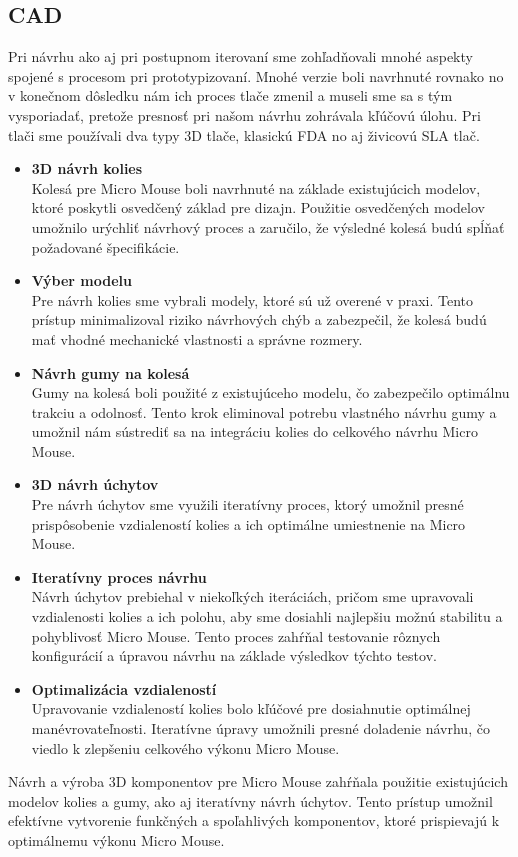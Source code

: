 \clearpage\subsection{CAD}
Pri návrhu ako aj pri postupnom iterovaní sme zohľadňovali mnohé aspekty spojené s procesom pri prototypizovaní. Mnohé verzie boli navrhnuté rovnako no v konečnom dôsledku nám ich proces tlače zmenil a museli sme sa s tým vysporiadať, pretože presnosť pri našom návrhu zohrávala kľúčovú úlohu. Pri tlači sme používali dva typy 3D tlače, klasickú FDA no aj živicovú SLA tlač.
\begin{itemize}
\item \textbf{3D návrh kolies}\\
Kolesá pre Micro Mouse boli navrhnuté na základe existujúcich modelov, ktoré poskytli osvedčený základ pre dizajn. Použitie osvedčených modelov umožnilo urýchliť návrhový proces a zaručilo, že výsledné kolesá budú spĺňať požadované špecifikácie.

\item \textbf{Výber modelu}\\
Pre návrh kolies sme vybrali modely, ktoré sú už overené v praxi. Tento prístup minimalizoval riziko návrhových chýb a zabezpečil, že kolesá budú mať vhodné mechanické vlastnosti a správne rozmery.

\item \textbf{Návrh gumy na kolesá}\\
Gumy na kolesá boli použité z existujúceho modelu, čo zabezpečilo optimálnu trakciu a odolnosť. Tento krok eliminoval potrebu vlastného návrhu gumy a umožnil nám sústrediť sa na integráciu kolies do celkového návrhu Micro Mouse.

\item \textbf{3D návrh úchytov}\\
Pre návrh úchytov sme využili iteratívny proces, ktorý umožnil presné prispôsobenie vzdialeností kolies a ich optimálne umiestnenie na Micro Mouse.

\item \textbf{Iteratívny proces návrhu}\\
Návrh úchytov prebiehal v niekoľkých iteráciách, pričom sme upravovali vzdialenosti kolies a ich polohu, aby sme dosiahli najlepšiu možnú stabilitu a pohyblivosť Micro Mouse. Tento proces zahŕňal testovanie rôznych konfigurácií a úpravou návrhu na základe výsledkov týchto testov.

\item \textbf{Optimalizácia vzdialeností}\\
Upravovanie vzdialeností kolies bolo kľúčové pre dosiahnutie optimálnej manévrovateľnosti. Iteratívne úpravy umožnili presné doladenie návrhu, čo viedlo k zlepšeniu celkového výkonu Micro Mouse.
\end{itemize}
\clearpage Návrh a výroba 3D komponentov pre Micro Mouse zahŕňala použitie existujúcich modelov kolies a gumy, ako aj iteratívny návrh úchytov. Tento prístup umožnil efektívne vytvorenie funkčných a spoľahlivých komponentov, ktoré prispievajú k optimálnemu výkonu Micro Mouse.

